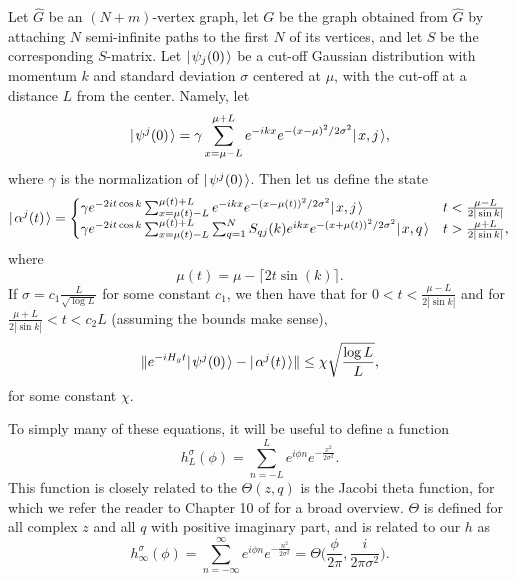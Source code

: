 \documentclass[../thesis-main/thesis-main]{subfiles}
\begin{document}
\begin{theorem}
  Let $\widehat{G}$ be an $(N+m)$-vertex graph, let $G$ be the graph obtained from $\widehat{G}$ by attaching $N$ semi-infinite paths to the first $N$ of its vertices, and let $S$ be the corresponding $S$-matrix.  Let $|\mspace{2mu} \psi_j(0) \mspace{2mu} \rangle$ be a cut-off Gaussian distribution with momentum $k$ and standard deviation $\sigma$ centered at $\mu$, with the cut-off at a distance $L$ from the center.  Namely, let 
  \begin{equation}
    |\mspace{2mu} \psi^j(0) \mspace{2mu} \rangle = \gamma \sum_{x = \mu - L}^{\mu + L} e^{- i k x} e^{- (x - \mu)^2/2\sigma^2} |\mspace{2mu} x,j \mspace{2mu} \rangle  \label{eq:guass_start_defn},
  \end{equation}
  where $\gamma$ is the normalization of $|\mspace{2mu} \psi^j(0) \mspace{2mu} \rangle$.  Then let us define the state 
  \begin{equation}
    |\mspace{2mu} \alpha^j(t) \mspace{2mu} \rangle =\begin{cases}  \gamma e^{-2 i t \cos k} \sum_{x = \mu(t) -L}^{\mu(t)+L} e^{-i k x} e^{ -(x - \mu(t))^2/2\sigma^2} 
    			 |\mspace{2mu} x,j \mspace{2mu} \rangle & t < \frac{\mu-L}{2|\sin k|}\\
			 \gamma e^{-2 i t \cos k} \sum_{x = \mu(t)-L}^{\mu(t) + L} \sum_{q=1}^N  S_{qj}(k) e^{i k x} e^{-(x + \mu(t))^2/2\sigma^2} |\mspace{2mu} x,q \mspace{2mu} \rangle & t > \frac{\mu+L}{2|\sin k|},\end{cases}\label{eq:guass_approximation_defn}
  \end{equation}
  where
  \begin{equation}
    \mu(t) = \mu - \lceil 2 t \sin(k)\rceil.
  \end{equation}
  If $\sigma = c_1 \frac{ L}{\sqrt{\log L}}$ for some constant $c_1$, we then have that for $0 < t < \frac{\mu - L}{2|\sin k|}$ and for $\frac{\mu + L}{2|\sin k|} < t < c_2 L$ (assuming the bounds make sense),  
  \begin{equation}
    \|{e^{-i H_g t} |\mspace{2mu} \psi^j(0) \mspace{2mu} \rangle - |\mspace{2mu} \alpha^j (t) \mspace{2mu} \rangle}\| \leq \chi \sqrt{\frac{\log L}{L}},
  \end{equation}  
  for some constant $\chi$.
\end{theorem}

To simply many of these equations, it will be useful to define a function
\begin{equation}
  h_L^\sigma(\phi) = \sum_{n = -L}^L e^{i \phi n} e^{-\frac{ x^2}{2\sigma^2}}. 
  \label{eq:h_L_defn}
\end{equation}
This function is closely related to the $\Theta(z,q)$ is the Jacobi theta function, for which we refer the reader to Chapter 10 of \cite{SSCA} for a broad overview.  $\Theta$ is defined for all complex $z$ and all $q$ with positive imaginary part, and is related to our $h$ as 
\begin{equation}
  h_{\infty}^\sigma(\phi) = \sum_{n = -\infty}^\infty e^{ i \phi n} e^{ - \frac{ n^2}{2\sigma^2}} = \Theta\Bigg(\frac{\phi}{2\pi}, \frac{i}{2\pi \sigma^2} \Bigg).
\end{equation}
\end{document}
